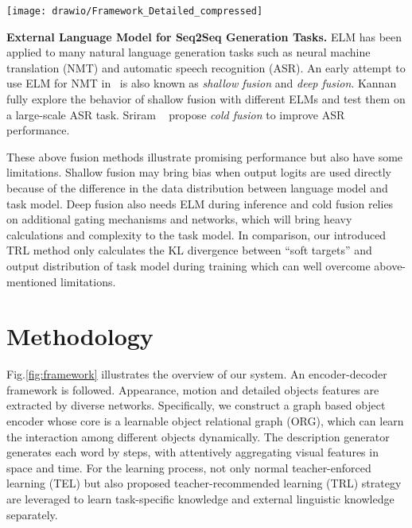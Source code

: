 \documentclass[10pt,twocolumn,letterpaper]{article}
\begin{document}
\begin{figure*}
	\centering
	\texttt{[image: drawio/Framework\_Detailed\_compressed]}
	\caption{The overview of our proposed ORG-TRL system. It mainly consists of the ORG based object encoder presented in the top-left box, and the hierarchical decoder with temporal/spatial attention in the top-right box. Our model is under the co-guidance of the novel TRL in the bottom-left box and the common TEL in the bottom-right. It also illustrates a virtual example during training: when , the TEL forces the model to learn ``talk'', but the TRL recommends the model to learn more words via the knowledge from ELM.}
	\label{fig:framework}
	\vspace{-0.5cm}
\end{figure*}


\textbf{External Language Model for Seq2Seq Generation Tasks.} ELM has been applied to many natural language generation tasks such as neural machine translation (NMT) and automatic speech recognition (ASR). An early attempt to use ELM for NMT in~\cite{Guelcehre2015} is also known as \textit{shallow fusion} and \textit{deep fusion}. Kannan \etal~\cite{Kannan2018} fully explore the behavior of shallow fusion with different ELMs and test them on a large-scale ASR task. Sriram \etal~\cite{Sriram2018} propose \textit{cold fusion} to improve ASR performance.

These above fusion methods illustrate promising performance but also have some limitations. Shallow fusion may bring bias when output logits are used directly because of the difference in the data distribution between language model and task model. Deep fusion also needs ELM during inference and cold fusion relies on additional gating mechanisms and networks, which will bring heavy calculations and complexity to the task model. In comparison, our introduced TRL method only calculates the KL divergence between ``soft targets'' and output distribution of task model during training which can well overcome above-mentioned limitations.



\section{Methodology}

Fig.\ref{fig:framework} illustrates the overview of our system. An encoder-decoder framework is followed. Appearance, motion and detailed objects features are extracted by diverse networks. Specifically, we construct a graph based object encoder whose core is a learnable object relational graph (ORG), which can learn the interaction among different objects dynamically. The description generator generates each word by steps, with attentively aggregating visual features in space and time. For the learning process, not only normal teacher-enforced learning (TEL) but also proposed teacher-recommended learning (TRL) strategy are leveraged to learn task-specific knowledge and external linguistic knowledge separately.
\end{document}

